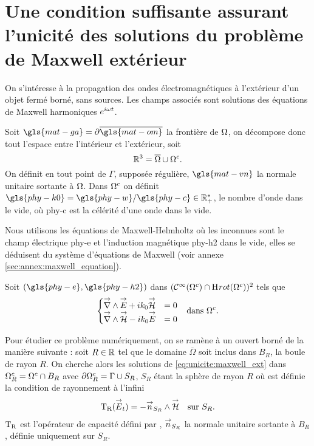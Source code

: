 \section[Une CSU des solutions du problème de Maxwell extérieur]{Une condition suffisante assurant l'unicité des solutions du problème de Maxwell extérieur}

  On s’intéresse à la propagation des ondes électromagnétiques à l'extérieur d'un objet fermé borné, sans sources. Les champs associés sont solutions des équations de Maxwell harmoniques \(e^{i\w t}\). 

  Soit \(\gls{mat-ga}=\partial\overline{\gls{mat-om}}\) la frontière de \(\OO\), on décompose donc tout l'espace entre l'intérieur et l'extérieur, soit 
  \[
    \RR^3 = \overline{\OO}\cup{\OO}^c.
  \]
  On définit en tout point de \(\Gamma\), supposée régulière, \(\gls{mat-vn}\) la normale unitaire sortante à \(\OO\).
  Dans \(\OO^c\) on définit \(\gls{phy-k0}=\gls{phy-w} / \gls{phy-c} \in \RR_+^*\), le nombre d'onde dans le vide, où \gls{phy-c} est la célérité d'une onde dans le vide.

  Nous utilisons les équations de Maxwell-Helmholtz où les inconnues sont le champ électrique \gls{phy-e} et l'induction magnétique \gls{phy-h2} dans le vide, elles se déduisent du système d'équations de Maxwell (voir annexe \ref{sec:annex:maxwell_equation}). 

  Soit \((\gls{phy-e},\gls{phy-h2})\) dans \((\mathcal{C}^\infty(\OO^c)\cap\Sobolev[rot](\OO^c))^2\) tels que
  \begin{align}
  \left\lbrace
    \begin{matrix}
      \vrot \vE + i k_0 \vH &= 0
      \\
      \vrot \vH - i k_0 \vE &= 0
    \end{matrix}
    \right. && \text{dans \(\OO^c\).}
    \label{eq:unicite:maxwell_ext}
  \end{align}


  Pour étudier ce problème numériquement, on se ramène à un ouvert borné de la manière suivante :   soit \(R\in\RR\) tel que le domaine \(\overline{\Omega}\) soit inclus dans \(B_R\), la boule de rayon \(R\). On cherche alors les solutions de \eqref{eq:unicite:maxwell_ext} dans \(\OO^c_R=\OO^c\cap B_R\) avec \(\partial\OO^c_R = \Gamma\cup S_R\), \(S_R\) étant la sphère de rayon \(R\) où est définie la condition de rayonnement à l'infini
  \begin{equation}
    \label{eq:unicite:TR}
    \begin{aligned}
    \Tr(\vE_t) = - \vn_{S_R} \pvect \vH && \text{sur \(S_R\).}
    \end{aligned}
  \end{equation}
  \(\Tr\) est l'opérateur de capacité défini par \cite[p.~200]{nedelec_acoustic_2001}, \(\vn_{S_R}\) la normale unitaire sortante à \(B_R\), définie uniquement sur \(S_R\).

